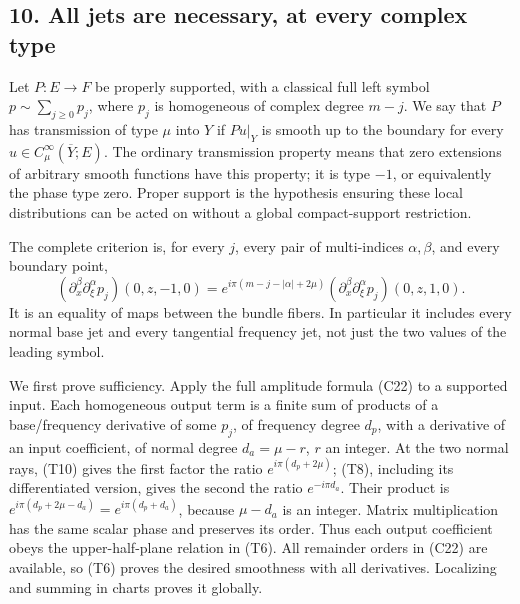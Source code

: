 \documentclass[
  11pt,
]{article}
\makeatletter
\let\ReaderOriginalAnchorStart\hyper@anchorstart
\let\ReaderOriginalAnchorEnd\hyper@anchorend
\let\ReaderPendingAliases\@empty
\def\ReaderArmAliases#1{\gdef\ReaderPendingAliases{#1}}
\def\hyper@anchorstart#1{\ReaderIfNativeAnchorTF{#1}{\ReaderPendingAliases\global\let\ReaderPendingAliases\@empty}{}\ReaderOriginalAnchorStart{#1}}
\makeatother
\begin{document}
\ReaderArmAliases{\ReaderOriginalAnchorStart{AN03-TR-003}\ReaderOriginalAnchorEnd\begingroup\expandafter\def\csname @currentHref\endcsname{AN03-TR-003}\label{AN03-TR-003}\endgroup\ReaderOriginalAnchorStart{an03-tr-003-all-jets-are-necessary-at-every-complex-type}\ReaderOriginalAnchorEnd\begingroup\expandafter\def\csname @currentHref\endcsname{an03-tr-003-all-jets-are-necessary-at-every-complex-type}\label{an03-tr-003-all-jets-are-necessary-at-every-complex-type}\endgroup\ReaderOriginalAnchorStart{10-all-jets-are-necessary-at-every-complex-type}\ReaderOriginalAnchorEnd\begingroup\expandafter\def\csname @currentHref\endcsname{10-all-jets-are-necessary-at-every-complex-type}\label{10-all-jets-are-necessary-at-every-complex-type}\endgroup\ReaderOriginalAnchorStart{all-jets-are-necessary-at-every-complex-type}\ReaderOriginalAnchorEnd}
\subsection{10. All jets are necessary, at every complex
type}\label{all-jets-are-necessary-at-every-complex-type}

Let \(P:E\to F\) be properly supported, with a classical full left
symbol \(p\sim\sum_{j\geq0}p_j\), where \(p_j\) is homogeneous of
complex degree \(m-j\). We say that \(P\) has transmission of type
\(\mu\) into \(Y\) if \(Pu|_Y\) is smooth up to the boundary for every
\(u\in C_\mu^\infty(\overline Y;E)\). The ordinary transmission property
means that zero extensions of arbitrary smooth functions have this
property; it is type \(-1\), or equivalently the phase type zero. Proper
support is the hypothesis ensuring these local distributions can be
acted on without a global compact-support restriction.

The complete criterion is, for every \(j\), every pair of multi-indices
\(\alpha,\beta\), and every boundary point, \[
(\partial_x^\beta\partial_\xi^\alpha p_j)(0,z,-1,0)
=e^{i\pi(m-j-|\alpha|+2\mu)}
(\partial_x^\beta\partial_\xi^\alpha p_j)(0,z,1,0).
\tag{T10}
\] It is an equality of maps between the bundle fibers. In particular it
includes every normal base jet and every tangential frequency jet, not
just the two values of the leading symbol.

We first prove sufficiency. Apply the full amplitude formula (C22) to a
supported input. Each homogeneous output term is a finite sum of
products of a base/frequency derivative of some \(p_j\), of frequency
degree \(d_p\), with a derivative of an input coefficient, of normal
degree \(d_a=\mu-r\), \(r\) an integer. At the two normal rays, (T10)
gives the first factor the ratio \(e^{i\pi(d_p+2\mu)}\); (T8), including
its differentiated version, gives the second the ratio
\(e^{-i\pi d_a}\). Their product is
\(e^{i\pi(d_p+2\mu-d_a)}=e^{i\pi(d_p+d_a)}\), because \(\mu-d_a\) is an
integer. Matrix multiplication has the same scalar phase and preserves
its order. Thus each output coefficient obeys the upper-half-plane
relation in (T6). All remainder orders in (C22) are available, so (T6)
proves the desired smoothness with all derivatives. Localizing and
summing in charts proves it globally.
\end{document}
